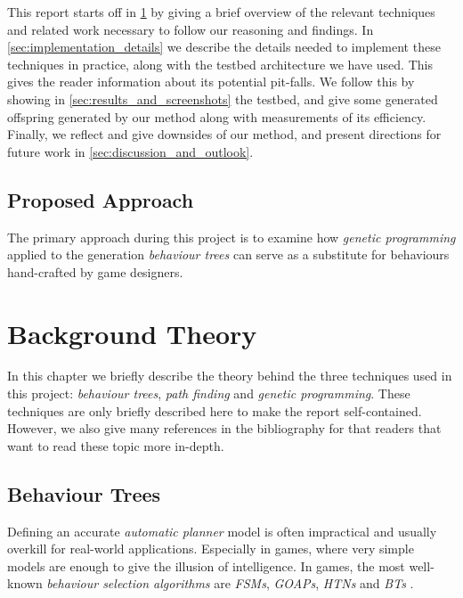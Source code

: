\documentclass[a4paper, twocolumn]{article}
\begin{document}
    This report starts off in \cref{sec:background_theory} by giving a brief overview of the relevant techniques and related work necessary to follow our reasoning and findings. In \cref{sec:implementation_details} we describe the details needed to implement these techniques in practice, along with the testbed architecture we have used. This gives the reader information about its potential pit-falls. We follow this by showing in \cref{sec:results_and_screenshots} the testbed, and give some generated offspring generated by our method along with measurements of its efficiency. Finally, we reflect and give downsides of our method, and present directions for future work in \cref{sec:discussion_and_outlook}.

    \subsection{Proposed Approach} \label{sec:proposed_approach}

    The primary approach during this project is to examine how \textit{genetic programming} applied to the generation \emph{behaviour trees} can serve as a substitute for behaviours hand-crafted by game designers. 

    \section{Background Theory} \label{sec:background_theory}

    In this chapter we briefly describe the theory behind the three techniques used in this project: \emph{behaviour trees}, \emph{path finding} and \emph{genetic programming}. These techniques are only briefly described here to make the report self-contained. However, we also give many references in the bibliography for that readers that want to read these topic more in-depth.

        \subsection{Behaviour Trees} \label{sec:behaviour_trees}

        Defining an accurate \emph{automatic planner} model is often impractical and usually overkill for real-world applications. Especially in games, where very simple models are enough to give the illusion of intelligence. In games, the most well-known \emph{behaviour selection algorithms} are \emph{FSMs}, \emph{GOAPs}, \emph{HTNs} and \emph{BTs} \cite{dawe2014overview}.
\end{document}
